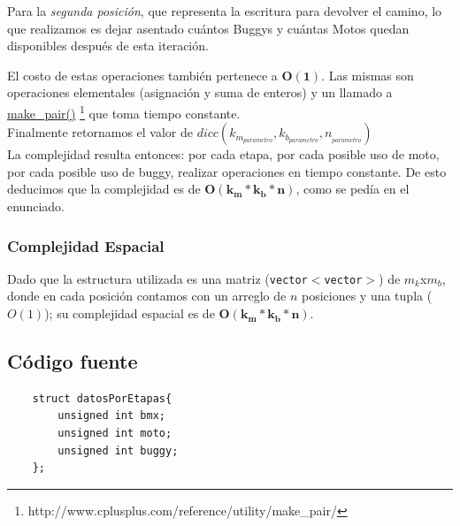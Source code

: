 \newpage

Para la \emph{segunda posici\'on}, que representa la escritura para devolver el camino, lo que realizamos es dejar asentado cu\'antos Buggys y cu\'antas Motos quedan disponibles despu\'es de esta iteraci\'on. 

El costo de estas operaciones tambi\'en pertenece a $\mathbf{O(1)}$. Las mismas son operaciones elementales (asignaci\'on y suma de enteros) y un llamado a  \href{http://www.cplusplus.com/reference/utility/make_pair/}{make\_pair()} \footnote{http://www.cplusplus.com/reference/utility/make_pair/} que toma tiempo constante.\\



Finalmente retornamos el valor de $dicc(k_{m_{parametro}},k_{b_{parametro}},n_{_{parametro}})$\\

La complejidad resulta entonces: por cada etapa, por cada posible uso de moto, por cada posible uso de buggy, realizar operaciones en tiempo constante. De esto deducimos que la complejidad es de $\mathbf{O(k_{m} * k_{b} * n)}$, como se ped\'ia en el enunciado.

\subsubsection{Complejidad Espacial}
Dado que la estructura utilizada es una matriz (\texttt{vector$<$vector$>$}) de $m_k$x$m_b$, donde en cada posici\'on contamos con un arreglo de $n$ posiciones y una tupla ($O(1)$); su complejidad espacial es de $\mathbf{O(k_m * k_b * n)}$.

\newpage
\subsection{C\'odigo fuente}
	\begin{codesnippet}
	\begin{verbatim}
    struct datosPorEtapas{
        unsigned int bmx;
        unsigned int moto;
        unsigned int buggy;
    };
	\end{verbatim}
	\end{codesnippet}

